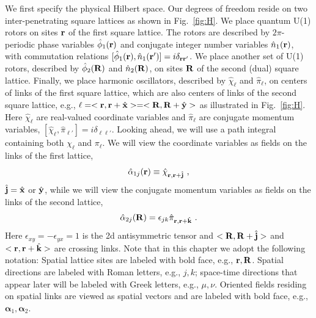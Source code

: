 We first specify the physical Hilbert space.  Our degrees of freedom reside on two inter-penetrating square lattices as shown in Fig.~\ref{fig:H}.  We place quantum U(1) rotors on sites ${\bf r}$ of the first square lattice.  The rotors are described by $2\pi$-periodic phase variables $\hat{\phi}_1({\bf r})$ and conjugate integer number variables $\hat{n}_1({\bf r})$, with commutation relations $[\hat{\phi}_1({\bf r}), \hat{n}_1({\bf r}')] = i \delta_{{\bf r}{\bf r}'}$.  We place another set of U(1) rotors, described by $\hat{\phi}_2({\bf R})$ and $\hat{n}_2({\bf R})$, on sites ${\bf R}$ of the second (dual) square lattice.  Finally, we place harmonic oscillators, described by $\hat{\chi}_\ell$ and $\hat{\pi}_\ell$, on centers of links of the first square lattice, which are also centers of links of the second square lattice, e.g., $\ell = <{\bf r}, {\bf r} + \hat{{\bf x}}> = <{\bf R}, {\bf R} + \hat{{\bf y}}>$ as illustrated in Fig.~\ref{fig:H}.  Here $\hat{\chi}_\ell$ are real-valued coordinate variables and $\hat{\pi}_\ell$ are conjugate momentum variables, $[\hat{\chi}_\ell, \hat{\pi}_{\ell'}] = i\delta_{\ell\ell'}$.  Looking ahead, we will use a path integral containing both $\chi_\ell$ and $\pi_\ell$.  We will view the coordinate variables as fields on the links of the first lattice,
\begin{equation}
\hat{\alpha}_{1j}({\bf r}) \equiv \hat{\chi}_{{\bf r}, {\bf r} + \hat{{\bf j}}} ~,
\end{equation}
$\hat{{\bf j}} = \hat{{\bf x}}$ or $\hat{{\bf y}}$, while we will view the conjugate momentum variables as fields on the links of the second lattice,
\begin{equation}
\hat{\alpha}_{2j}({\bf R}) = \epsilon_{jk} \hat{\pi}_{{\bf r}, {\bf r} + \hat{{\bf k}}} ~.
\end{equation}
Here $\epsilon_{xy} = -\epsilon_{yx} = 1$ is the 2d antisymmetric tensor and $<{\bf R}, {\bf R} + \hat{{\bf j}}>$ and $<{\bf r}, {\bf r} + \hat{{\bf k}}>$ are crossing links.\cite{footnoteKitaev}
Note that in this chapter we adopt the following notation:  Spatial lattice sites are labeled with bold face, e.g., ${\bf r}, {\bf R}$.  Spatial directions are labeled with Roman letters, e.g., $j, k$; space-time directions that appear later will be labeled with Greek letters, e.g., $\mu, \nu$.  Oriented fields residing on spatial links are viewed as spatial vectors and are labeled with bold face, e.g., ${\bm \alpha_1}, {\bm \alpha_2}$.

%


